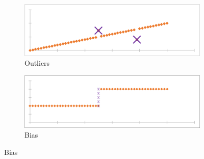 \documentclass[main.tex]{subfiles}
\begin{document}
      \begin{figure}[h]
        \begin{subfigure}{0.48\linewidth}
          \centering
          \includegraphics[width=0.9\linewidth]{figures/outlierPOI}
          \caption{Outliers}
          \label{fig:poi:outlier}
        \end{subfigure}
        \begin{subfigure}{0.48\linewidth}
          \centering
          \includegraphics[width=0.9\linewidth]{figures/biasPOI}
          \caption{Bias}
          \label{fig:poi:bias}
        \end{subfigure}
        

\end{figure}
\end{document}
